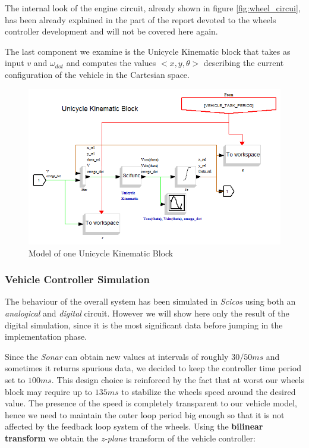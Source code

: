 The internal look of the engine circuit, already shown in figure \ref{fig:wheel_circui}, has been already explained in the part of the report devoted to the wheels controller development and will not be covered here again.

The last component we examine is the Unicycle Kinematic block that takes as input $v$ and $\omega_{dot}$ and computes the values $<x, y, \theta>$ describing the current configuration of the vehicle in the Cartesian space.

\begin{figure}[H]
  \begin{center}
  \includegraphics[scale=0.51]{FIGURES_3/Unicycle_Kinematic_Block.png}
    \caption[]{Model of one Unicycle Kinematic Block}
    \label{fig:rlVehicle5}
  \end{center}
\end{figure}

\subsubsection{Vehicle Controller Simulation}

The behaviour of the overall system has been simulated in \textit{Scicos} using both an \textit{analogical} and \textit{digital} circuit. However we will show here only the result of the digital simulation, since it is the most significant data before jumping in the implementation phase. 

Since the \textit{Sonar} can obtain new values at intervals of roughly $30/50ms$ and sometimes it returns spurious data, we decided to keep the controller time period set to $100ms$. This design choice is reinforced by the fact that at worst our wheels block may require up to $135ms$ to stabilize the wheels speed around the desired value. The presence of the speed is completely transparent to our vehicle model, hence we need to maintain the outer loop period big enough so that it is not affected by the feedback loop system of the wheels. Using the \textbf{bilinear transform} we obtain the \textit{z-plane} transform of the vehicle controller:

